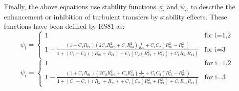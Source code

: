 Finally, the above equations use stability functions $\phi_i$ and $\psi_i$,
to describe the enhancement or inhibition of turbulent transfers by
stability effects. These functions have been defined by RS81 as:
%
\begin{equation} \label{eqphi3}
\phi_i=\left\{ \begin{array}{ll}
         1 & \mbox{for i=1,2}\\
         1-\frac{(1+C_1R_{r 1})(2C_2R_{\theta r 3}^2+C_1R_{\theta 3}^2)
         \frac{1}{R_{\theta 1}}+C_1C_2(R_{\theta 3}^2-R_{r 3}^2)}
         {1+(C_1+C_2)(R_{\theta 1} + R_{r 1})+C_1(C_2(R_{\theta 1}^2 +
         R_{r 1}^2)+C_1R_{\theta 1} R_{r 1})} & \mbox{for i=3}
               \end{array}
        \right.
\end{equation}
\begin{equation} \label{eqpsi3}
\psi_i=\left\{ \begin{array}{ll}
                   1 & \mbox{for i=1,2}\\
       1-\frac{(1+C_1R_{\theta 1})(2C_2R_{\theta r 3}^2+C_1R_{r 3}^2)
          \frac{1}{R_{r 1}}+C_1C_2(R_{r 3}^2-R_{\theta 3}^2)}
               {1+(C_1+C_2)(R_{\theta 1}+R_{r 1})+C_1(C_2(R_{\theta 1}^2 +
              R_{r 1}^2)+C_1R_{\theta 1}R_{r 1})} & \mbox{for i=3}
               \end{array}
        \right.
\end{equation}
\\

